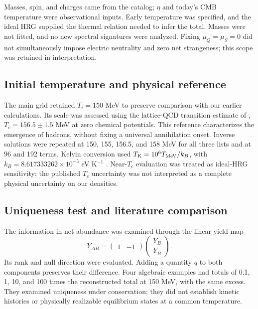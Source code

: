 Masses, spin, and charges came from the catalog; $\eta$ and today's CMB temperature were observational inputs. Early temperature was specified, and the ideal HRG supplied the thermal relation needed to infer the total. Masses were not fitted, and no new spectral signatures were analyzed. Fixing $\mu_Q=\mu_S=0$ did not simultaneously impose electric neutrality and zero net strangeness; this scope was retained in interpretation.

\subsection{Initial temperature and physical reference}
The main grid retained $T_i=150$ MeV to preserve comparison with our earlier calculations. Its scale was assessed using the lattice-QCD transition estimate of \citet{Bazavov2019}, $T_c=156.5\pm1.5$ MeV at zero chemical potentials. This reference characterizes the emergence of hadrons, without fixing a universal annihilation onset. Inverse solutions were repeated at 150, 155, 156.5, and 158 MeV for all three lists and at 96 and 192 terms. Kelvin conversion used $T_{\rm K}=10^6T_{\rm MeV}/k_B$, with $k_B=8.617333262\times10^{-5}$ eV K$^{-1}$ \citep{Robinson2025}. Near-$T_c$ evaluation was treated as ideal-HRG sensitivity; the published $T_c$ uncertainty was not interpreted as a complete physical uncertainty on our densities.

\subsection{Uniqueness test and literature comparison}
The information in net abundance was examined through the linear yield map
\begin{equation}
Y_{\Delta B}=\begin{pmatrix}1&-1\end{pmatrix}
\begin{pmatrix}Y_B\\Y_{\bar B}\end{pmatrix}.
\label{eq:rank}
\end{equation}
Its rank and null direction were evaluated. Adding a quantity $q$ to both components preserves their difference. Four algebraic examples had totals of 0.1, 1, 10, and 100 times the reconstructed total at 150 MeV, with the same excess. They examined uniqueness under conservation; they did not establish kinetic histories or physically realizable equilibrium states at a common temperature.


